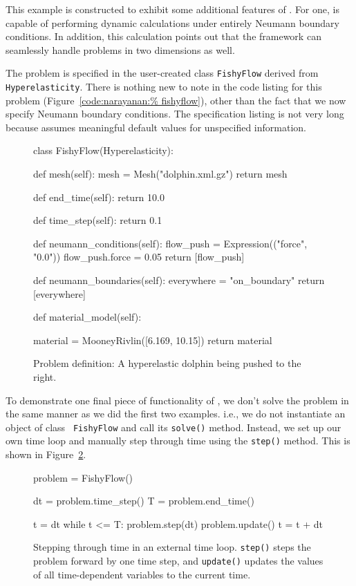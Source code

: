 This example is constructed to exhibit some additional features of
\twist. For one, \twist{} is capable of performing dynamic calculations
under entirely Neumann boundary conditions. In addition, this
calculation points out that the framework can seamlessly handle
problems in two dimensions as well.

The problem is specified in the user-created class {\tt FishyFlow}
derived from {\tt Hyperelasticity}. There is nothing new to note in
the code listing for this problem (Figure~\ref{code:narayanan:%
fishyflow}), other than the fact that we now specify Neumann boundary
conditions. The specification listing is not very long because
\twist{} assumes meaningful default values for unspecified
information.

\begin{figure}[ht]
\begin{python}
class FishyFlow(Hyperelasticity):

    def mesh(self):
        mesh = Mesh("dolphin.xml.gz")
        return mesh

    def end_time(self):
        return 10.0

    def time_step(self):
        return 0.1

    def neumann_conditions(self):
        flow_push = Expression(("force", "0.0"))
        flow_push.force = 0.05
        return [flow_push]

    def neumann_boundaries(self):
        everywhere = "on_boundary"
        return [everywhere]

    def material_model(self):

        material = MooneyRivlin([6.169, 10.15])
        return material
\end{python}
\caption{Problem definition: A hyperelastic dolphin being pushed to
  the right.}
\label{code:narayanan:fishyflow}
\end{figure}

To demonstrate one final piece of functionality of \twist, we don't
solve the problem in the same manner as we did the first two
examples. i.e., we do not instantiate an object of class {\tt
  FishyFlow} and call its {\tt solve()} method. Instead, we set up our
own time loop and manually step through time using the {\tt step()}
method. This is shown in Figure~\ref{code:narayanan:manualstep}.

\begin{figure}[ht]
\begin{python}
problem = FishyFlow()

dt = problem.time_step()
T = problem.end_time()

t = dt
while t <= T:
    problem.step(dt)
    problem.update()
    t = t + dt
\end{python}
\caption{Stepping through time in an external time loop. {\tt step()}
  steps the problem forward by one time step, and {\tt update()}
  updates the values of all time-dependent variables to the current time.}
\label{code:narayanan:manualstep}
\end{figure}

